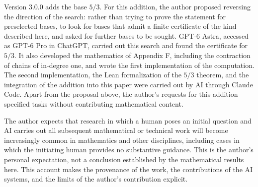 \documentclass[11pt,reqno]{amsart}
\theoremstyle{definition}
\theoremstyle{remark}
\begin{document}
Version 3.0.0 adds the base \(5/3\). For this addition, the author proposed reversing the direction of the search: rather than trying to prove the statement for preselected bases, to look for bases that admit a finite certificate of the kind described here, and asked for further bases to be sought. GPT-6 Astra, accessed as GPT-6 Pro in ChatGPT, carried out this search and found the certificate for \(5/3\). It also developed the mathematics of Appendix F, including the contraction of chains of in-degree one, and wrote the first implementation of the computation. The second implementation, the Lean formalization of the \(5/3\) theorem, and the integration of the addition into this paper were carried out by AI through Claude Code. Apart from the proposal above, the author's requests for this addition specified tasks without contributing mathematical content.

The author expects that research in which a human poses an initial question and AI carries out all subsequent mathematical or technical work will become increasingly common in mathematics and other disciplines, including cases in which the initiating human provides no substantive guidance. This is the author's personal expectation, not a conclusion established by the mathematical results here. This account makes the provenance of the work, the contributions of the AI systems, and the limits of the author's contribution explicit.
\end{document}
